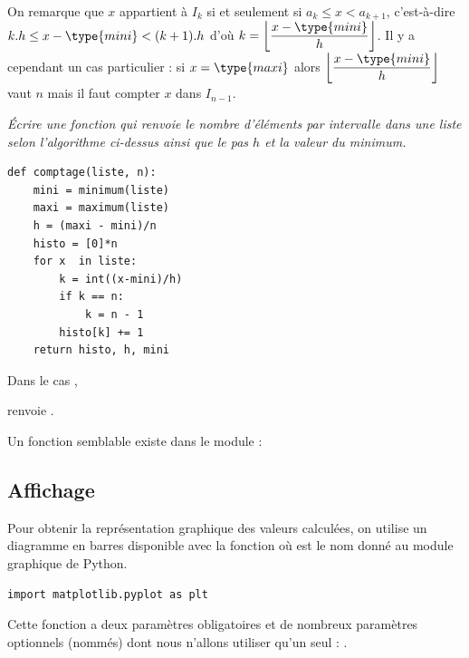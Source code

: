 On remarque que $x$ appartient à $I_k$ si et seulement si $a_k\le x < a_{k+1}$, c'est-à-dire 
$k.h \le x - \type{mini} < (k+1).h$ d'où $\displaystyle k =\left\lfloor\frac{x - \type{mini}}h\right\rfloor$.
Il y a cependant un cas particulier : si $x=\type{maxi}$ alors $\displaystyle \left\lfloor\frac{x - \type{mini}}h\right\rfloor$ vaut $n$ mais il faut compter $x$ dans $I_{n-1}$.

\begin{Exercise}\it Écrire une fonction  qui renvoie le nombre d'éléments par intervalle dans une liste  selon l'algorithme ci-dessus ainsi que le pas $h$ et la valeur du minimum.
\end{Exercise}
\begin{Answer}
\begin{lstlisting}
def comptage(liste, n):
    mini = minimum(liste)
    maxi = maximum(liste)
    h = (maxi - mini)/n
    histo = [0]*n
    for x  in liste:
        k = int((x-mini)/h)
        if k == n:
            k = n - 1
        histo[k] += 1
    return histo, h, mini
\end{lstlisting}
\newpage
\end{Answer}
Dans le cas , 

 renvoie .

{\sf Un fonction semblable existe dans le module  : }
\subsection{Affichage}
Pour obtenir la représentation graphique des valeurs calculées, on utilise un diagramme en barres disponible avec la fonction  où  est le nom donné au module graphique de Python.
\begin{lstlisting}
import matplotlib.pyplot as plt
\end{lstlisting}
Cette fonction a deux paramètres obligatoires et de nombreux paramètres optionnels (nommés) dont nous n'allons utiliser qu'un seul : .

